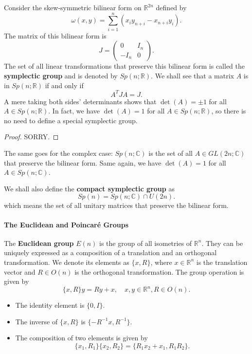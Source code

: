 \documentclass[../main.tex]{subfiles}
\begin{document}
Consider the skew-symmetric bilinear form on $\mathbb{R}^{2n}$ defined by
\begin{equation*}
	\omega(x,y) = \sum_{i=1}^n (x_i y_{n+i} - x_{n+i} y_i).
\end{equation*}
The matrix of this bilinear form is
\begin{equation*}
	J = \begin{pmatrix}
		0    & I_n \\
		-I_n & 0
	\end{pmatrix}.
\end{equation*}
The set of all linear transformations that preserve this bilinear form is called the \textbf{symplectic group} and is denoted by $Sp(n;\mathbb{R})$. We shall see that a matrix $A$ is in $Sp(n;\mathbb{R})$ if and only if
\begin{equation*}
	A^T J A = J.
\end{equation*}
A mere taking both sides' determinants shows that $\det(A) = \pm 1$ for all $A \in Sp(n;\mathbb{R})$. In fact, we have $\det(A) = 1$ for all $A \in Sp(n;\mathbb{R})$, so there is no need to define a special symplectic group.
\begin{proof}
	SORRY.
\end{proof}
The same goes for the complex case: $Sp(n;\mathbb{C})$ is the set of all $A \in GL(2n;\mathbb{C})$ that preserve the bilinear form. Same again, we have $\det(A) = 1$ for all $A \in Sp(n;\mathbb{C})$.

We shall also define the \textbf{compact symplectic group} as
\begin{equation*}
	Sp(n) = Sp(n;\mathbb{C}) \cap U(2n).
\end{equation*}
which means the set of all unitary matrices that preserve the bilinear form.

\paragraph{The Euclidean and Poincar\'e Groups}
The \textbf{Euclidean group} $E(n)$ is the group of all isometries of $\mathbb{R}^n$. They can be uniquely expressed as a composition of a translation and an orthogonal transformation. We denote its elements as $\{x,R\}$, where $x \in \mathbb{R}^n$ is the translation vector and $R \in O(n)$ is the orthogonal transformation. The group operation is given by
\begin{equation}
	\{x, R\} y = R y + x, \quad x,y \in \mathbb{R}^n, R \in O(n).
\end{equation}
\begin{itemize}
	\item The identity element is $\{0, I\}$.
	\item The inverse of $\{x, R\}$ is $\{-R^{-1} x, R^{-1}\}$.
	\item The composition of two elements is given by
	      \begin{equation*}
		      \{x_1, R_1\} \{x_2, R_2\} = \{R_1 x_2 + x_1, R_1 R_2\}.
	      \end{equation*}
\end{itemize}
\end{document}
